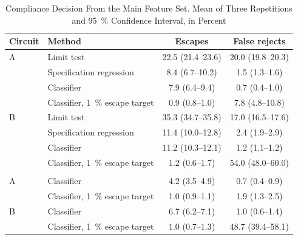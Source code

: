 \begin{table}[!t]
\caption{Compliance Decision From the Main Feature Set. Mean of Three Repetitions and
\SI{95}{\percent} Confidence Interval, in Percent}
\label{tab:decision}
\centering
\setlength{\tabcolsep}{3.5pt}
\begin{tabular}{@{}llcc@{}}
\toprule
Circuit & Method & Escapes & False rejects \\
\midrule
A & Limit test & 22.5 (21.4--23.6) & 20.0 (19.8--20.3) \\
 & Specification regression & 8.4 (6.7--10.2) & 1.5 (1.3--1.6) \\
 & Classifier & 7.9 (6.4--9.4) & 0.7 (0.4--1.0) \\
 & Classifier, \SI{1}{\percent} escape target & 0.9 (0.8--1.0) & 7.8 (4.8--10.8) \\
\addlinespace
B & Limit test & 35.3 (34.7--35.8) & 17.0 (16.5--17.6) \\
 & Specification regression & 11.4 (10.0--12.8) & 2.4 (1.9--2.9) \\
 & Classifier & 11.2 (10.3--12.1) & 1.2 (1.1--1.2) \\
 & Classifier, \SI{1}{\percent} escape target & 1.2 (0.6--1.7) & 54.0 (48.0--60.0) \\
\addlinespace
\multicolumn{4}{@{}l}{\emph{Without porous dry electrodes}} \\
A & Classifier & 4.2 (3.5--4.9) & 0.7 (0.4--0.9) \\
 & Classifier, \SI{1}{\percent} escape target & 1.0 (0.9--1.1) & 1.9 (1.3--2.5) \\
B & Classifier & 6.7 (6.2--7.1) & 1.0 (0.6--1.4) \\
 & Classifier, \SI{1}{\percent} escape target & 1.0 (0.7--1.3) & 48.7 (39.4--58.1) \\
\bottomrule
\end{tabular}
\end{table}

